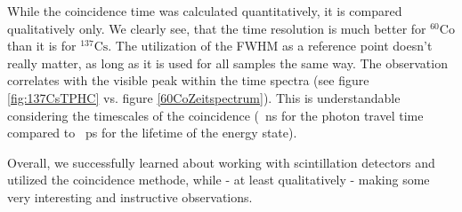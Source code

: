 %
\par
%
While the coincidence time was calculated quantitatively, it is compared qualitatively only.
We clearly see, that the time resolution is much better for $^{60}\text{Co}$ than it is for $^{137}\text{Cs}$.
The utilization of the FWHM as a reference point doesn't really matter, as long as it is used for all samples the same way.
The observation correlates with the visible peak within the time spectra (see figure \ref{fig:137CsTPHC} vs. figure \ref{60CoZeitspectrum}).
This is understandable considering the timescales of the coincidence (\SI{}{\nano\second} for the photon travel time compared to \SI{}{\pico\second} for the lifetime of the energy state).
%
\par
%
Overall, we successfully learned about working with scintillation detectors and utilized the coincidence methode, while - at least qualitatively - making some very interesting and instructive observations.
